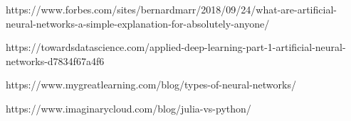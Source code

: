 \documentclass{article}
\begin{document}
\begin{thebibliography}{9}





https://www.forbes.com/sites/bernardmarr/2018/09/24/what-are-artificial-neural-networks-a-simple-explanation-for-absolutely-anyone/

https://towardsdatascience.com/applied-deep-learning-part-1-artificial-neural-networks-d7834f67a4f6

https://www.mygreatlearning.com/blog/types-of-neural-networks/

https://www.imaginarycloud.com/blog/julia-vs-python/
 \end{thebibliography}
    

\end{document}

